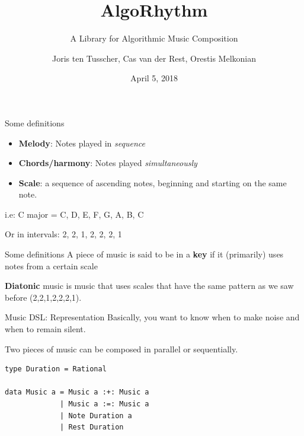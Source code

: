 \documentclass{beamer}
\title{AlgoRhythm}
\subtitle{A Library for Algorithmic Music Composition}
\author{Joris ten Tusscher, Cas van der Rest, Orestis Melkonian}
\date{April 5, 2018}
\institute{Universiteit Utrecht}
\begin{document}
	\maketitle

  \begin{frame}{Some definitions}
    	\begin{itemize}
    	\item
        \textbf{Melody}: Notes played in \emph{sequence}
        \item
        \textbf{Chords/harmony}: Notes played \emph{simultaneously}
        \item
        \textbf{Scale}: a sequence of ascending notes, beginning and starting on the same note.
    	\end{itemize}

       	i.e: C major = C, D, E, F, G, A, B, C

        Or in intervals: 2, 2, 1, 2, 2, 2, 1
    \end{frame}

    \begin{frame}{Some definitions}
    	A piece of music is said to be in a \textbf{key} if it (primarily) uses notes from a certain scale

        \textbf{Diatonic} music is music that uses scales that have the same pattern as we saw before (2,2,1,2,2,2,1).
    \end{frame}

    \begin{frame}[fragile=singleslide]{Music DSL: Representation}
	Basically, you want to know when to make noise and when to remain silent.

    Two pieces of music can be composed in parallel or sequentially.
    \begin{verbatim}
type Duration = Rational

data Music a = Music a :+: Music a
             | Music a :=: Music a
             | Note Duration a
             | Rest Duration
    \end{verbatim}
	\end{frame}
\end{document}
